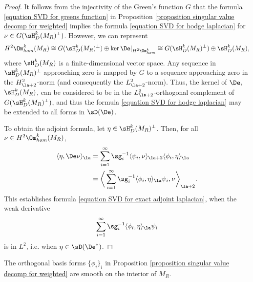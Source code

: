 \documentclass[hidelinks, 12pt, oneside, reqno]{amsart}
\begin{document}
\begin{proof}
    It follows from the injectivity of the Green's function $G$ that the formula \eqref{equation SVD for greens function} in Proposition \ref{proposition singular value decomp for weighted} implies the formula \eqref{equation SVD for hodge laplacian} for $\nu \in G(\sH^k_D(M_R)^\perp)$. However, we can represent \[
    H^2\Om^k_{hom}(M_R) \cong G(\sH^k_D(M_R)^\perp) \oplus \ker \De|_{H^2\Om^k_{hom}} \cong G(\sH^k_D(M_R)^\perp) \oplus \sH^k_D(M_R),
    \]
    where $\sH^k_D(M_R)$ is a finite-dimensional vector space. Any sequence in $\sH^k_D(M_R)^\perp$ approaching zero is mapped by $G$ to a sequence approaching zero in the $H^2_{\la+2}$-norm (and consequently the $L^2_{\la+2}$-norm). Thus, the kernel of $\De$, $\sH^k_D(M_R)$, can be considered to be in the $L^2_{\la+2}$-orthogonal complement of $G(\sH^k_D(M_R)^\perp)$, and thus the formula \eqref{equation SVD for hodge laplacian} may be extended to all forms in $\sD(\De)$.
    
    To obtain the adjoint formula, let $\eta \in \sH^k_D(M_R)^\perp$. Then, for all $\nu \in H^2 \Om^k_{hom} (M_R)$,
    \begin{align*}
        \langle \eta, \De \nu \rangle_{\la} &= \sum_{i=1}^\infty \sg_i^{-1} \langle \psi_i, \nu \rangle_{\la + 2} \langle \phi_i, \eta \rangle_{\la} \\
        &= \bigg \langle \sum_{i=1}^\infty \sg_i^{-1} \langle \phi_i, \eta \rangle_{\la} \psi_i, \nu \bigg\rangle_{\la+2}.
    \end{align*}
    This establishes formula \eqref{equation SVD for exact adjoint laplacian}, when the weak derivative 
    \[
    \sum_{i=1}^\infty \sg_i^{-1} \langle \phi_i, \eta \rangle_{\la} \psi_i
    \]
    is in $L^2$, i.e. when $\eta \in \sD(\De^*)$.
\end{proof}



\begin{cor}\label{corollary smoothness of eigenforms}
The orthogonal basis forms $\{\phi_i\}_i$ in Proposition \ref{proposition singular value decomp for weighted} are smooth on the interior of $M_R$. 
\end{cor}
\end{document}

